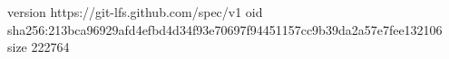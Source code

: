 version https://git-lfs.github.com/spec/v1
oid sha256:213bca96929afd4efbd4d34f93e70697f94451157cc9b39da2a57e7fee132106
size 222764
